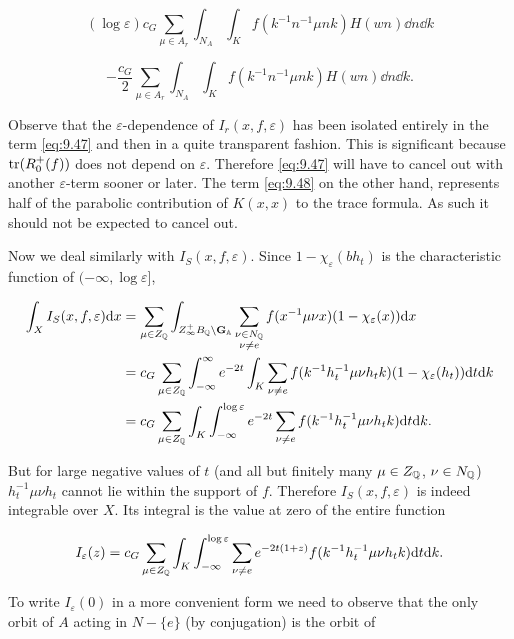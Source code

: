 \begin{equation}\label{eq:9.47}
(\log\varepsilon)c_G\sum_{\mu \in A_r}\int_{N_A}\int_K f(k^{-1}n^{-1}\mu nk)H(wn)\dd n\dd k\tag{9.47}
\end{equation}

\begin{equation}\label{eq:9.48}
- \frac{c_G}{2}\sum_{\mu \in A_r}\int_{N_A}\int_K f(k^{-1}n^{-1}\mu nk)H(wn)\dd n\dd k.\tag{9.48}
\end{equation}

Observe that the $\varepsilon$-dependence of $I_r(x, f, \varepsilon)$ has been isolated entirely in the term \eqref{eq:9.47} and then in a quite transparent fashion. This is significant because $\operatorname{tr}(R_0^{+}(f))$ does not depend on $\varepsilon$. Therefore \eqref{eq:9.47} will have to cancel out with another $\varepsilon$-term sooner or later. The term \eqref{eq:9.48} on the other hand, represents half of the parabolic contribution of $K(x, x)$ to the trace formula. As such it should not be expected to cancel out.

Now we deal similarly with $I_S(x, f, \varepsilon)$. Since $1 - \chi_\varepsilon(bh_t)$ is the characteristic function of $(-\infty, \log\varepsilon]$,

\[
\begin{aligned}
\int_X I_S(x, f, \varepsilon)\mathrm{d} x &= \sum_{\mu \in Z_{\mathbb{Q}}}\int_{Z_\infty^{+}B_{\mathbb{Q}} \backslash \mathbf{G}_{\mathbb{A}}}\sum_{\substack{\nu \in N_{\mathbb{Q}}\\ \nu \neq e}} f(x^{-1}\mu\nu x)(1 - \chi_\varepsilon(x))\mathrm{d} x\\
&= c_G\sum_{\mu \in Z_{\mathbb{Q}}}\int_{-\infty}^{\infty} e^{-2t}\int_K \sum_{\nu \neq e} f(k^{-1}h_t^{-1}\mu\nu h_tk)(1 - \chi_\varepsilon(h_t))\mathrm{d} t\mathrm{d} k\\
&= c_G\sum_{\mu \in Z_{\mathbb{Q}}}\int_K\int_{-\infty}^{\log\varepsilon} e^{-2t}\sum_{\nu \neq e} f(k^{-1}h_t^{-1}\mu\nu h_tk)\mathrm{d} t\mathrm{d} k.
\end{aligned}
\]

But for large negative values of $t$ (and all but finitely many $\mu \in Z_{\mathbb{Q}}$, $\nu \in N_{\mathbb{Q}}$) $h_t^{-1}\mu\nu h_t$ cannot lie within the support of $f$. Therefore $I_S(x, f, \varepsilon)$ is indeed integrable over $X$. Its integral is the value at zero of the entire function

\[
I_\varepsilon(z) = c_G\sum_{\mu \in Z_{\mathbb{Q}}}\int_K\int_{-\infty}^{\log\varepsilon}\sum_{\nu \neq e} e^{-2t(1+z)}f(k^{-1}h_t^{-1}\mu\nu h_tk)\mathrm{d} t\mathrm{d} k.
\]

To write $I_\varepsilon(0)$ in a more convenient form we need to observe that the only orbit of $A$ acting in $N - \{e\}$ (by conjugation) is the orbit of

